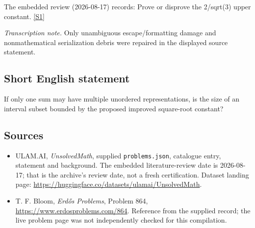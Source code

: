 \documentclass[11pt,a4paper]{article}
\newcommand{\sref}[2]{\hyperlink{source:#1:#2}{[S#2]}}
\begin{document}
The embedded review (2026-08-17) records: Prove or disprove the 2/sqrt(3) upper constant. \sref{statement}{1}

{\small\emph{Transcription note.} Only unambiguous escape/formatting damage and nonmathematical serialization debris were repaired in the displayed source statement.}

\subsection{Short English statement}

If only one sum may have multiple unordered representations, is the size of an interval subset bounded by the proposed improved square-root constant?

\subsection{Sources}

{\small

\begin{itemize}

\item[\hypertarget{source:statement:1}{S1}] ULAM.AI, \emph{UnsolvedMath}, supplied \texttt{problems.json}, catalogue entry, statement and background. The embedded literature-review date is 2026-08-17; that is the archive’s review date, not a fresh certification. Dataset landing page: \url{https://huggingface.co/datasets/ulamai/UnsolvedMath}.

\item[\hypertarget{source:statement:2}{S2}] T. F. Bloom, \emph{Erdős Problems}, Problem 864, \url{https://www.erdosproblems.com/864}. Reference from the supplied record; the live problem page was not independently checked for this compilation.

\end{itemize}

}

\label{end:statement}
\end{document}
